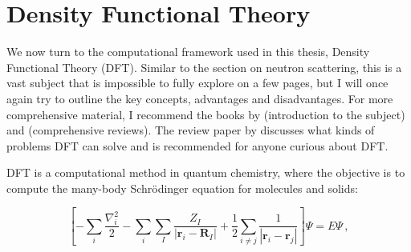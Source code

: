 \section{Density Functional Theory}\label{sec:dft}
We now turn to the computational framework used in this thesis, Density Functional Theory (DFT). Similar to the section on neutron scattering, this is a vast subject that is impossible to fully explore on a few pages, but I will once again try to outline the key concepts, advantages and disadvantages. For more comprehensive material, I recommend the books by \citeauthor{Giustino2014} \cite{Giustino2014} (introduction to the subject) and \citeauthor{Martin2004} \cite{Martin2004,Martin2016} (comprehensive reviews). The review paper by \citeauthor{Hoffmann1987} \cite{Hoffmann1987} discusses what kinds of problems DFT can solve and is recommended for anyone curious about DFT.

DFT is a computational method in quantum chemistry, where the objective is to compute the many-body Schr\"odinger equation for molecules and solids:

\begin{equation}\label{eq:mbse}
	\left[ -\sum_i \frac{\nabla_i^2}{2} - \sum_{i} \sum_{I} \frac{Z_I}{|\bm{r}_i - \bm{R}_I|} + \frac{1}{2} \sum_{i \neq j} \frac{1}{|\bm{r}_i - \bm{r}_j|} \right] \Psi = E \Psi \, ,
\end{equation}

